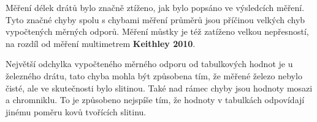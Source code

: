 \documentclass[0-protokol.tex]{subfiles}
\begin{document}
Měření délek drátů bylo značně ztíženo, jak bylo popsáno ve výsledcích měření. Tyto značné chyby spolu s chybami měření průměrů jsou příčinou velkých chyb vypočtených měrných odporů. Měření můstky je též zatíženo velkou nepřesností, na rozdíl od měření multimetrem \textbf{Keithley 2010}.

Největší odchylka vypočteného měrného odporu od tabulkových hodnot je u železného drátu, tato chyba mohla být způsobena tím, že měřené železo nebylo čisté, ale ve skutečnosti bylo slitinou. Také nad rámec chyby jsou hodnoty mosazi a chromniklu. To je způsobeno nejspíše tím, že hodnoty v tabulkách odpovídají jinému poměru kovů tvořících slitinu.
\end{document}
